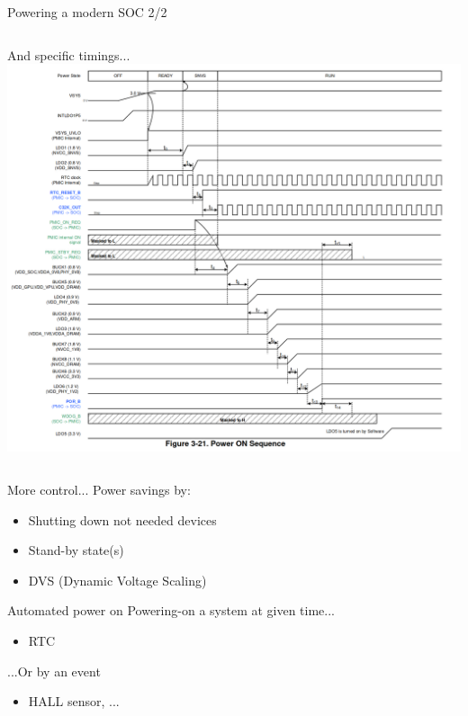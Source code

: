 \documentclass[10pt]{beamer}
\begin{document}

\begin{frame}{Powering a modern SOC 2/2}
	\begin{columns}[onlytextwidth]
		And specific timings...
	\vspace{4pt}
		\includegraphics[width=1\linewidth]{img/BD71847_start_up_seq.png}
	\end{columns}
\end{frame}


\begin{frame}{More control...}
Power savings by:
\begin{itemize}
	\item Shutting down not needed devices
	\item Stand-by state(s)
	\item DVS (Dynamic Voltage Scaling)
\end{itemize}
\end{frame}


\begin{frame}{Automated power on}
Powering-on a system at given time...
\begin{itemize}
	\item RTC
\end{itemize}
...Or by an event
\begin{itemize}
	\item HALL sensor, ...
\end{itemize}
\end{frame}
\end{document}
